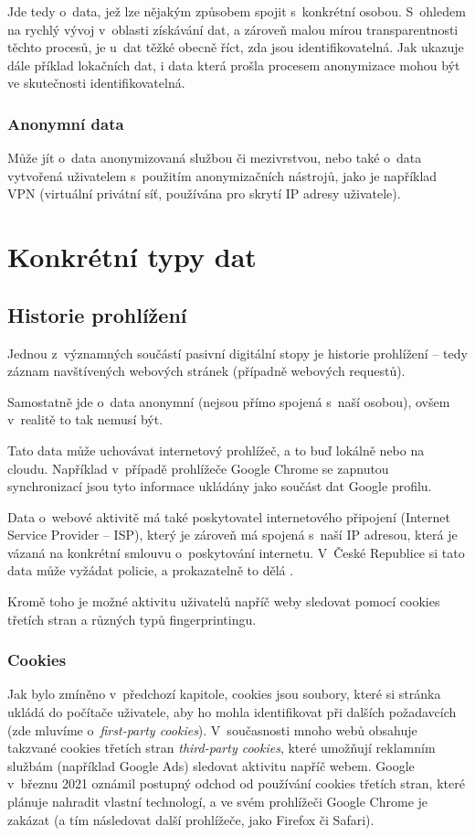 Jde tedy o~data, jež lze nějakým způsobem spojit s~konkrétní osobou. S~ohledem na rychlý vývoj v~oblasti získávání dat, a zároveň malou mírou transparentnosti těchto procesů, je u~dat těžké obecně říct, zda jsou identifikovatelná. Jak ukazuje dále příklad lokačních dat, i data která prošla procesem anonymizace mohou být ve skutečnosti identifikovatelná.  

\subsubsection*{Anonymní data}

Může jít o~data anonymizovaná službou či mezivrstvou, nebo také o~data vytvořená uživatelem s~použitím anonymizačních nástrojů, jako je například VPN (virtuální privátní síť, používána pro skrytí IP adresy uživatele).


\section{Konkrétní typy dat}

\subsection{Historie prohlížení}
Jednou z~významných součástí pasivní digitální stopy je historie prohlížení -- tedy záznam navštívených webových stránek (případně webových requestů).


Samostatně jde o~data anonymní (nejsou přímo spojená s~naší osobou), ovšem v~realitě to tak nemusí být.

Tato data může uchovávat internetový prohlížeč, a to buď lokálně nebo na cloudu. Například v~případě prohlížeče Google Chrome se zapnutou synchronizací jsou tyto informace ukládány jako součást dat Google profilu.

Data o~webové aktivitě má také poskytovatel internetového připojení (Internet Service Provider -- ISP), který je zároveň má spojená s~naší IP adresou, která je vázaná na konkrétní smlouvu o~poskytování internetu. V~České Republice si tato data může vyžádat policie, a prokazatelně to dělá \citep{policie-isp}.

Kromě toho je možné aktivitu uživatelů napříč weby sledovat pomocí cookies třetích stran a různých typů fingerprintingu.

\subsubsection*{Cookies}
Jak bylo zmíněno v~předchozí kapitole, cookies jsou soubory, které si stránka ukládá do počítače uživatele, aby ho mohla identifikovat při dalších požadavcích (zde mluvíme o~\textit{first-party cookies}). V~současnosti mnoho webů obsahuje takzvané cookies třetích stran \textit{third-party cookies}, které umožňují reklamním službám (například Google Ads) sledovat aktivitu napříč webem.
Google v~březnu 2021 oznámil postupný odchod od používání cookies třetích stran, které plánuje nahradit vlastní technologí, a ve svém prohlížeči Google Chrome je zakázat (a tím následovat další prohlížeče, jako Firefox či Safari).

